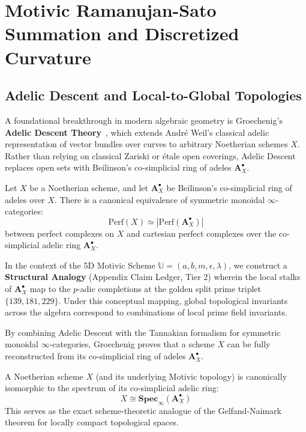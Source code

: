 \section{Motivic Ramanujan-Sato Summation and Discretized Curvature}

\subsection{Adelic Descent and Local-to-Global Topologies}
A foundational breakthrough in modern algebraic geometry is Groechenig's \textbf{Adelic Descent Theory}~\cite{Groechenig2017}, which extends André Weil's classical adelic representation of vector bundles over curves to arbitrary Noetherian schemes $X$. Rather than relying on classical Zariski or étale open coverings, Adelic Descent replaces open sets with Beilinson's co-simplicial ring of adeles $\mathbf{A}^\bullet_X$.

\begin{theorem}
Let $X$ be a Noetherian scheme, and let $\mathbf{A}^\bullet_X$ be Beilinson's co-simplicial ring of adeles over $X$. There is a canonical equivalence of symmetric monoidal $\infty$-categories:
\begin{equation}
\mathrm{Perf}(X) \simeq |\mathrm{Perf}(\mathbf{A}^\bullet_X)|
\end{equation}
between perfect complexes on $X$ and cartesian perfect complexes over the co-simplicial adelic ring $\mathbf{A}^\bullet_X$.
\end{theorem}

In the context of the 5D Motivic Scheme $\mathbb{U} = (a, b, m, \epsilon, \lambda)$, we construct a \textbf{Structural Analogy} (Appendix Claim Ledger, Tier 2) wherein the local stalks of $\mathbf{A}^\bullet_X$ map to the $p$-adic completions at the golden split prime triplet $\{139, 181, 229\}$. Under this conceptual mapping, global topological invariants across the algebra correspond to combinations of local prime field invariants.

By combining Adelic Descent with the Tannakian formalism for symmetric monoidal $\infty$-categories, Groechenig proves that a scheme $X$ can be fully reconstructed from its co-simplicial ring of adeles $\mathbf{A}^\bullet_X$.

\begin{theorem}
A Noetherian scheme $X$ (and its underlying Motivic topology) is canonically isomorphic to the spectrum of its co-simplicial adelic ring:
\begin{equation}
X \cong \mathbf{Spec}_\infty(\mathbf{A}^\bullet_X)
\end{equation}
This serves as the exact scheme-theoretic analogue of the Gelfand-Naimark theorem for locally compact topological spaces.
\end{theorem}


